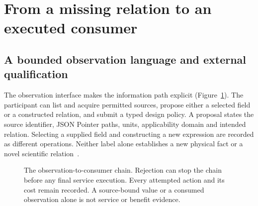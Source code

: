 \section{From a missing relation to an executed consumer}
\subsection{A bounded observation language and external qualification}
The observation interface makes the information path explicit
(Figure~\ref{fig:chain}). The participant can list and acquire permitted
sources, propose either a selected field or a constructed relation, and
submit a typed design policy. A proposal states the source identifier,
JSON Pointer paths, units, applicability domain and intended relation.
Selecting a supplied field and constructing a new expression are recorded
as different operations. Neither label alone establishes a new physical
fact or a novel scientific relation~\cite{contract,adapter}.

\begin{figure}[htbp]
\centering
{}
\caption{The observation-to-consumer chain. Rejection can stop the chain
before any final service execution. Every attempted action and its cost remain
recorded. A source-bound value or a consumed observation alone is not service
or benefit evidence.}
\label{fig:chain}
\end{figure}

